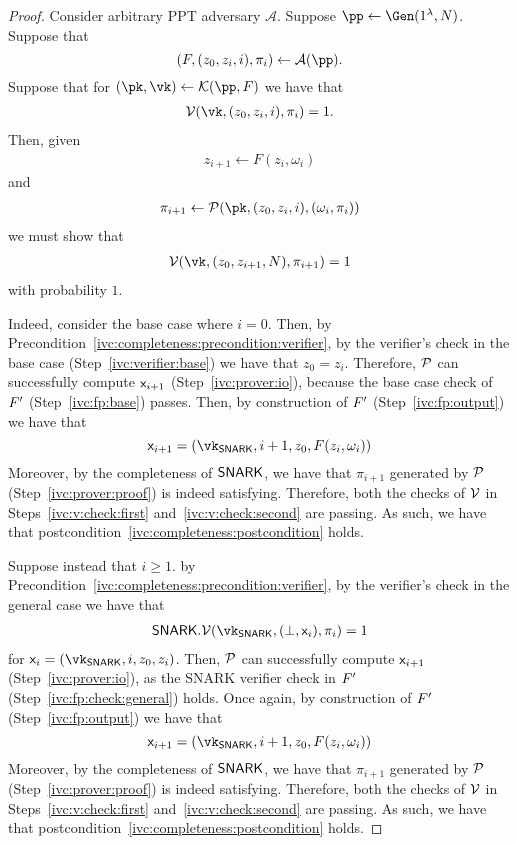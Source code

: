 \begin{proof}
 Consider arbitrary PPT adversary $\mathcal{A}$.
 Suppose $\pp \gets \Gen(1^{\lambda}, N)$.
 Suppose that
 \[
 (F, (z_0, z_i, i), \pi_i) \gets \mathcal{A}(\pp).
 \]
 Suppose that for
   $(\pk, \vk) \gets \En(\pp, F)$
 we have that
 \begin{align}\label{ivc:completeness:precondition:verifier}
   \V(\vk, (z_0, z_{i}, i), \pi_{i}) = 1.
 \end{align}
 Then,
 given
 \begin{align*}
   z_{i + 1} \gets F(z_{i}, \omega_{i})
 \end{align*}
 and 
 \begin{align*}
   \pi_{i + 1} \gets \Po(\pk, (z_0, z_i, i), (\omega_i, \pi_i))
 \end{align*}
 we must show that
 \begin{align}\label{ivc:completeness:postcondition}
   \V(\vk, (z_0, z_{i+1}, N), \pi_{i + 1}) = 1
 \end{align}
 with probability $1$.
 
 Indeed, 
 consider the base case where $i = 0$.
 Then, 
 by Precondition~\ref{ivc:completeness:precondition:verifier},
 by the verifier's check in the base case 
 (Step~\ref{ivc:verifier:base})
 we have that $z_0 = z_i$.
 Therefore,
 $\mathcal{P}$ can successfully compute $\mathsf{x}_{i + 1}$ 
 (Step~\ref{ivc:prover:io}),
 because the base case check of $F'$ 
 (Step~\ref{ivc:fp:base}) passes.
 Then,
 by construction of $F'$
 (Step~\ref{ivc:fp:output})
 we have that 
 \[
   \io_{i + 1} = (\vk_{\snark}, i + 1, z_0, F(z_i, \omega_i))
 \]
 Moreover,
 by the completeness
 of $\mathsf{SNARK}$,
 we have that $\pi_{i + 1}$ generated by $\mathcal{P}$ 
 (Step~\ref{ivc:prover:proof})
 is indeed satisfying.
 Therefore, 
 both the checks of $\mathcal{V}$ in Steps~\ref{ivc:v:check:first} and~\ref{ivc:v:check:second}
 are passing.
 As such,
 we have that postcondition~\ref{ivc:completeness:postcondition}
 holds.
 
 
 Suppose instead that $i \geq 1$.
 by Precondition~\ref{ivc:completeness:precondition:verifier},
 by the verifier's check in the general case 
 we have that
 \begin{align*}
   \snark.\V(\vk_\snark, (\bot, \io_i), \pi_i) = 1
 \end{align*}
 for $\io_i = (\vk_\snark, i, z_0, z_i)$.
 Then,
 $\mathcal{P}$ can successfully compute $\mathsf{x}_{i + 1}$ 
 (Step~\ref{ivc:prover:io}),
 as the SNARK verifier check in $F'$
 (Step~\ref{ivc:fp:check:general})
 holds.
 Once again,
 by construction of $F'$
 (Step~\ref{ivc:fp:output})
 we have that 
 \[
   \io_{i + 1} = (\vk_{\snark}, i + 1, z_0, F(z_i, \omega_i))
 \]
 Moreover,
 by the completeness
 of $\mathsf{SNARK}$,
 we have that $\pi_{i + 1}$ generated by $\mathcal{P}$ 
 (Step~\ref{ivc:prover:proof})
 is indeed satisfying.
 Therefore, 
 both the checks of $\mathcal{V}$ in Steps~\ref{ivc:v:check:first} and~\ref{ivc:v:check:second}
 are passing.
 As such,
 we have that postcondition~\ref{ivc:completeness:postcondition}
 holds.
\end{proof}

